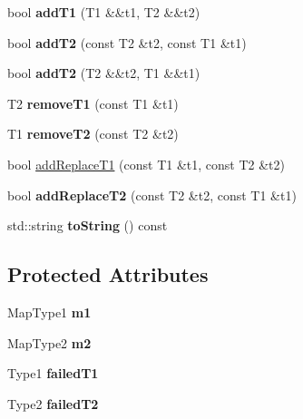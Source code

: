 \begin{DoxyCompactItemize}
$$bool {\bfseries add\+T1} (T1 \&\&t1, T2 \&\&t2)
\item 
\mbox{\label{classx2_1_1_mutual_map_a46bd0595e1983a9d4239a9c005ad45dc}} 
bool {\bfseries add\+T2} (const T2 \&t2, const T1 \&t1)
\item 
\mbox{\label{classx2_1_1_mutual_map_a585053ba0d6293850ca4af5b4a259cec}} 
bool {\bfseries add\+T2} (T2 \&\&t2, T1 \&\&t1)
\item 
\mbox{\label{classx2_1_1_mutual_map_a095d9b2f5e11716764c78e64a93f691d}} 
T2 {\bfseries remove\+T1} (const T1 \&t1)
\item 
\mbox{\label{classx2_1_1_mutual_map_a31ae2da8838537afba8bec8e0c560090}} 
T1 {\bfseries remove\+T2} (const T2 \&t2)
\item 
bool \hyperlink{classx2_1_1_mutual_map_adcf6a37d18e6db2939cb205c73ca9b72}{add\+Replace\+T1} (const T1 \&t1, const T2 \&t2)
\item 
\mbox{\label{classx2_1_1_mutual_map_ad0e9896b9abf29c9a6a81b69511387f1}} 
bool {\bfseries add\+Replace\+T2} (const T2 \&t2, const T1 \&t1)
\item 
\mbox{\label{classx2_1_1_mutual_map_a79a7822f40483ef63a78100ed1700e6a}} 
std\+::string {\bfseries to\+String} () const
\end{DoxyCompactItemize}
\subsection*{Protected Attributes}
\begin{DoxyCompactItemize}
\item 
\mbox{\label{classx2_1_1_mutual_map_a85e97b24c0cc1633aadc3739fa60569b}} 
Map\+Type1 {\bfseries m1}
\item 
\mbox{\label{classx2_1_1_mutual_map_a5f8f5940664f7842ad7b4c898a34e0a8}} 
Map\+Type2 {\bfseries m2}
\item 
\mbox{\label{classx2_1_1_mutual_map_a6c536ae71190e39f0c9ab7d75dd2f160}} 
Type1 {\bfseries failed\+T1}
\item 
\mbox{\label{classx2_1_1_mutual_map_a24c70f6ed99841b01ce43fa4514151c6}} 
Type2 {\bfseries failed\+T2}
\end{DoxyCompactItemize}


